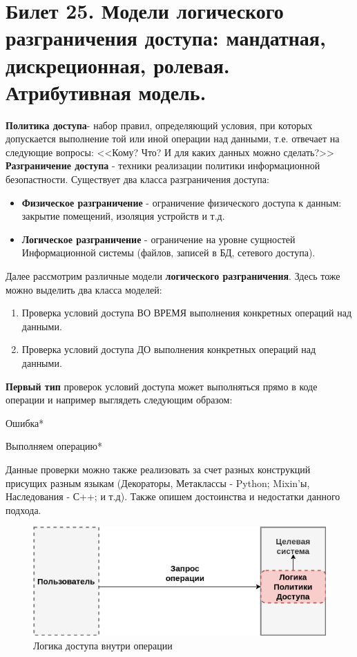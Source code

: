 \newpage
\section {Билет 25. Модели логического разграничения доступа: мандатная, дискреционная, ролевая. Атрибутивная модель.}
\textbf{Политика доступа}- набор правил, определяющий условия, при которых допускается выполнение той или иной операции над данными, т.е. отвечает на следующие вопросы: <<Кому? Что? И для каких данных можно сделать?>>
\textbf{Разграничение доступа} - техники реализации политики информационной безопастности. Существует два класса разграничения доступа:
\begin{itemize}
 \item \textbf{Физическое разграничение} - ограничение физического доступа к данным: закрытие помещений, изоляция устройств и т.д.
 \item \textbf{Логическое разграничение} - ограничение на уровне сущностей Информационной системы (файлов, записей в БД, сетевого доступа).
\end{itemize}

Далее рассмотрим различные модели \textbf{логического разграничения}. Здесь тоже можно выделить два класса моделей:
\begin{enumerate}
	\item Проверка условий доступа ВО ВРЕМЯ выполнения конкретных операций над данными. 
	\item Проверка условий доступа ДО выполнения конкретных операций над данными.
\end{enumerate}

\textbf{Первый тип} проверок условий доступа может выполняться прямо в коде операции и например выглядеть следующим образом:
\begin{algorithm}
\begin{algorithmic}[H]
	\State *Ошибка*
	\EndIf
	
	\State *Выполняем операцию*
\end{algorithmic}
\end{algorithm}
Данные проверки можно также реализовать за счет разных конструкций присущих разным языкам (Декораторы, Метаклассы - Python; Mixin'ы, Наследования - С++; и т.д). Также опишем достоинства и недостатки данного подхода.

\begin{figure}[H]
	\centering
	\includegraphics[scale = 0.7]{25/AC_in.png}
	\caption{Логика доступа внутри операции}
	\label{fig:ac_in}
\end{figure}


